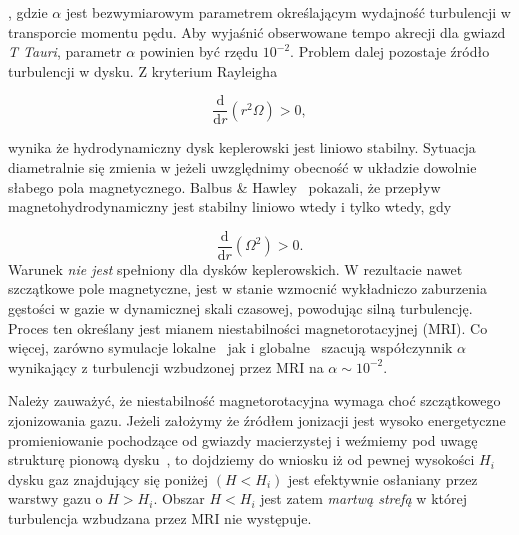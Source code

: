 , gdzie $\alpha$ jest bezwymiarowym parametrem określającym wydajność
turbulencji w transporcie momentu pędu. Aby wyjaśnić obserwowane tempo akrecji
dla gwiazd \emph{T Tauri}, parametr $\alpha$ powinien być rzędu $10^{-2}$.
Problem dalej pozostaje źródło turbulencji w dysku. Z kryterium
Rayleigha

\begin{equation}
   \frac{\mathrm{d}}{\mathrm{d}r}\left(r^2\Omega\right) > 0,
\end{equation}

wynika że hydrodynamiczny dysk keplerowski jest liniowo stabilny. Sytuacja
diametralnie się zmienia w jeżeli uwzględnimy obecność w układzie dowolnie
słabego pola magnetycznego. Balbus \& Hawley~\citep{BH91} pokazali, że przepływ
magnetohydrodynamiczny jest stabilny liniowo wtedy i tylko wtedy, gdy

\begin{equation}\label{eq:mri}
   \frac{\mathrm{d}}{\mathrm{d}r}\left(\Omega^2\right) > 0.
\end{equation}
Warunek  \emph{nie jest} spełniony dla dysków keplerowskich. W
rezultacie nawet szczątkowe pole magnetyczne, jest w stanie wzmocnić wykładniczo
zaburzenia gęstości w gazie w dynamicznej skali czasowej, powodując silną
turbulencję. Proces ten określany jest mianem niestabilności magnetorotacyjnej
(MRI). Co więcej, zarówno symulacje lokalne~\cite{DSP10} jak
i globalne~\cite{FD11} szacują współczynnik $\alpha$ wynikający z turbulencji
wzbudzonej przez MRI na $\alpha\sim 10^{-2}$.
\par Należy zauważyć, że niestabilność magnetorotacyjna wymaga choć szczątkowego
zjonizowania gazu. Jeżeli założymy że źródłem jonizacji jest wysoko energetyczne
promieniowanie pochodzące od gwiazdy macierzystej i weźmiemy pod uwagę strukturę
pionową dysku~, to dojdziemy do wniosku iż od pewnej wysokości
$H_i$ dysku gaz znajdujący się poniżej $(H < H_i)$ jest efektywnie osłaniany
przez warstwy gazu o $H > H_i$. Obszar $H < H_i$ jest zatem \emph{martwą strefą}
w której turbulencja wzbudzana przez MRI nie występuje.

